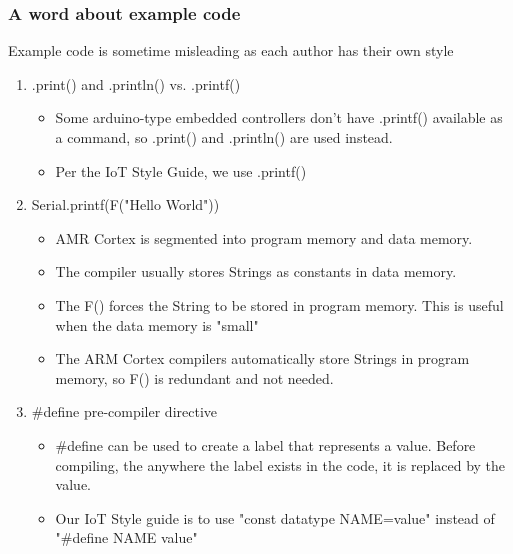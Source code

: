 \documentclass{beamer}
\begin{document}
\begin{frame}\frametitle{A word about example code}
Example code is sometime  misleading as each author has their own style

\begin{enumerate}
\item .print() and .println() vs. .printf()
	\begin{itemize}
	\item Some arduino-type embedded controllers don't have .printf() available as a command, so .print() and .println() are used instead. 
	\item Per the IoT Style Guide, we use .printf()
	\end{itemize}
\item Serial.printf(F("Hello World"))
	\begin{itemize}
	\item AMR Cortex is segmented into program memory and data memory. 
	\item The compiler usually stores Strings as constants in data memory. 
	\item The F() forces the String to be stored in program memory. This is useful when the data memory is "small"
	\item The ARM Cortex compilers automatically store Strings in program memory, so F() is redundant and not needed.
	\end{itemize}
\item \#define pre-compiler directive
	\begin{itemize}
	\item \#define can be used to create a label that represents a value. Before compiling, the anywhere the label exists in the code, it is replaced by the value. 
	\item Our IoT Style guide is to use "const datatype NAME=value" instead of "\#define NAME value"
	\end{itemize}
\end{enumerate}
\end{frame}
\end{document}
